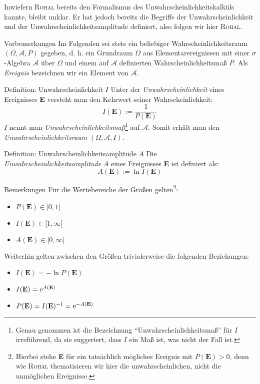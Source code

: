 Inwiefern \textsc{Rohal} bereits den Formalismus des Unwahrscheinlichkeitskalküls kannte, bleibt unklar. Er hat jedoch bereits die Begriffe der Unwahrscheinlichkeit und der Unwahrscheinlichkeitsamplitude definiert, also folgen wir hier \textsc{Rohal}.
\begin{bla}{Vorbemerkungen}
Im Folgenden sei stets ein beliebiger Wahrscheinlichkeitsraum $(\Omega,\mathcal{A},P)$ gegeben, d. h. ein Grundraum $\Omega$ aus Elementarereignissen mit einer $\sigma$-Algebra $\mathcal{A}$ über $\Omega$ und einem auf $\mathcal{A}$ definierten Wahrscheinlichkeitsmaß $P$. Als \emph{Ereignis} bezeichnen wir ein Element von $\mathcal{A}$.
\end{bla}
\begin{bla}{Definition: Unwahrscheinlichkeit $I$}
Unter der \emph{Unwahrscheinlichkeit} eines Ereignisses \textbf{E} versteht man den Kehrwert seiner Wahrscheinlichkeit:\\
\begin{equation}
I(\textbf{E}) := \frac{1}{P(\textbf{E})}
\end{equation}
$I$ nennt man \emph{Unwahrscheinlichkeitsmaß}\footnote{Genau genommen ist die Bezeichnung "`Unwahrscheinlichkeitsmaß"' für $I$ irreführend, da sie suggeriert, dass $I$ ein Maß ist, was nicht der Fall ist.} auf $\mathcal{A}$. Somit erhält man den \emph{Unwahrscheinlichkeitsraum} $(\Omega,\mathcal{A},I)$.
\end{bla}
\clearpage
\begin{bla}{Definition: Unwahrscheinlichkeitsamplitude $A$}
Die \emph{Unwahrscheinlichkeitsamplitude} $A$ eines Ereignisses \textbf{E} ist definiert als:
\begin{equation}
A(\textbf{E}) := \ln{I(\textbf{E})}
\end{equation}
\end{bla}
\begin{bla}{Bemerkungen}
Für die Wertebereiche der Größen gelten\footnote{Hierbei stehe \textbf{E} für ein tatsächlich mögliches Ereignis mit $P(\textbf{E}) > 0$, denn wie \textsc{Rohal} thematisieren wir hier die unwahrscheinlichen, nicht die unmöglichen Ereignisse.}:
\begin{itemize}
\item $P(\textbf{E}) \in ]0,1]$
\item $I(\textbf{E}) \in [1,\infty[$
\item $A(\textbf{E}) \in [0,\infty[$
\end{itemize}
Weiterhin gelten zwischen den Größen trivialerweise die folgenden Beziehungen:
\begin{itemize}
\item $I(\textbf{E}) = - \ln P(\textbf{E})$
\item $I(\textbf{E}) = \text{\rmfamily e} ^ {A(\textbf{E})}$
\item $P(\textbf{E}) = I(\textbf{E}) ^{-1} = \text{\rmfamily e} ^{-A(\textbf{E})}$
\end{itemize}
\end{bla}
